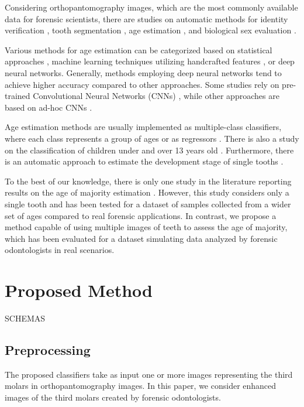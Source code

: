 \documentclass[conference]{IEEEtran}
\begin{document}
Considering orthopantomography images, which are the most commonly available data for forensic scientists, there are studies on automatic methods for identity verification \cite{FAN2020110416}, tooth segmentation \cite{a6bd905adf2c48db8e08e228d114d9c4}, age estimation \cite{Alkaabi2020}, and biological sex evaluation \cite{8977504}.

Various methods for age estimation can be categorized based on statistical approaches \cite{8073563}, machine learning techniques utilizing handcrafted features \cite{SARIC2022111245}, or deep neural networks. Generally, methods employing deep neural networks tend to achieve higher accuracy compared to other approaches. Some studies rely on pre-trained Convolutional Neural Networks (CNNs) \cite{10.1007/978-3-658-33198-6_46}, while other approaches are based on ad-hoc CNNs \cite{MILOSEVIC2022116038, healthcare11081068}.

Age estimation methods are usually implemented as multiple-class classifiers, where each class represents a group of ages \cite{healthcare11081068, 0a72cc460005411bac3e72cd31862059}  or as regressors \cite{SARIC2022111245, PMID33661340, MILOSEVIC2022116038}. There is also a study on the classification of children under and over 13 years old \cite{10.1007/978-3-658-33198-6_46}. Furthermore, there is an automatic approach to estimate the development stage of single tooths \cite{egitto}.  
 

To the best of our knowledge, there is only one study in the literature reporting results on the age of majority estimation \cite{PMID33661340}. However, this study considers only a single tooth and has been tested for a dataset of samples collected from a wider set of ages compared to real forensic applications. In contrast, we propose a method capable of using multiple images of teeth to assess the age of majority, which has been evaluated for a dataset simulating data analyzed by forensic odontologists in real scenarios.

\section{Proposed Method}
SCHEMAS
\subsection{Preprocessing}
The proposed classifiers take as input one or more images representing the third molars in orthopantomography images. In this paper, we consider enhanced images of the third molars created by forensic odontologists.
\end{document}
